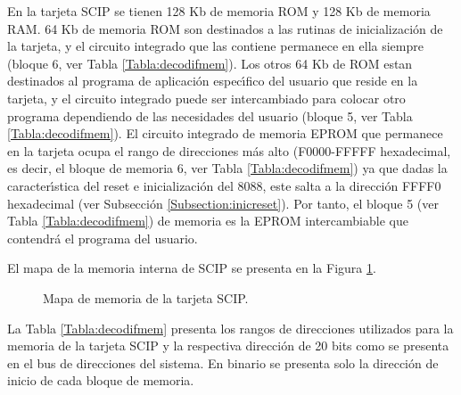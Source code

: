 En la tarjeta SCIP se tienen 128 Kb de memoria ROM y 128 Kb de memoria RAM. 64 Kb de memoria ROM %
son destinados a las rutinas de inicializaci\'on de la tarjeta, y el circuito integrado que las %
contiene permanece en ella siempre (bloque 6, ver Tabla \ref{Tabla:decodifmem}). Los otros 64 %
Kb de ROM estan destinados al programa de aplicaci\'on espec\'{\i}fico del usuario que reside %
en la tarjeta, y el circuito integrado puede ser intercambiado para colocar otro programa %
dependiendo de las necesidades del usuario (bloque 5, ver Tabla \ref{Tabla:decodifmem}). El %
circuito integrado de memoria EPROM que permanece en la tarjeta ocupa el rango de direcciones %
m\'as alto (F0000-FFFFF hexadecimal, es decir, el bloque de memoria 6, ver Tabla %
\ref{Tabla:decodifmem}) ya que dadas la caracter\'{\i}stica del reset e inicializaci\'on del %
8088, este salta a la direcci\'on FFFF0 hexadecimal (ver Subsecci\'on %
\ref{Subsection:inicreset}). Por tanto, el bloque 5 (ver Tabla \ref{Tabla:decodifmem}) de %
memoria es la EPROM intercambiable que contendr\'a el programa del usuario.

El mapa de la memoria interna de SCIP se presenta en la Figura \ref{Fig:mapamem}.

\begin{figure}[!htb]
\vskip 5mm
\vskip 78mm
\caption{Mapa de memoria de la tarjeta SCIP.}
\label{Fig:mapamem}
\end{figure}

La Tabla \ref{Tabla:decodifmem} presenta los rangos de direcciones utilizados para la memoria %
de la tarjeta SCIP y la respectiva direcci\'on de 20 bits como se presenta en el bus de %
direcciones del sistema. En binario se presenta solo la direcci\'on de inicio de cada bloque de %
memoria.

\vspace{12pt}

